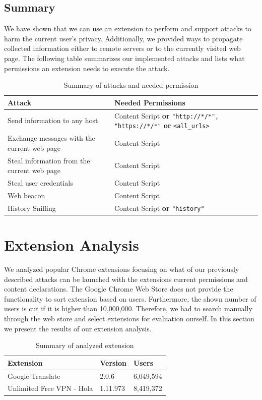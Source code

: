 \documentclass[article,colorback,accentcolor=tud9c,type=bsc]{tudthesis}
\let\stdsection\section
\let\stdsubsection\subsection
\renewcommand\section{\newpage\stdsection}
\renewcommand\subsection{\newpage\stdsubsection}
\begin{document}
\subsection{Summary}
	
	We have shown that we can use an extension to perform and support attacks to harm the current user's privacy. Additionally, we provided ways to propagate collected information either to remote servers or to the currently visited web page. The following table summarizes our implemented attacks and lists what permissions an extension needs to execute the attack.
	
	\begin{table}[h]
		\centering
		\begin{tabular}{|l|l|} \hline
			\textbf{Attack} & \textbf{Needed Permissions} \\ \hline
			Send information to any host & Content Script \textbf{or} \texttt{"http://*/*", "https://*/*"} \textbf{or} \texttt{<all\_urls>} \\
			Exchange messages with the current web page & Content Script \\
			Steal information from the current web page & Content Script \\
			Steal user credentials & Content Script \\
			Web beacon & Content Script \\
			History Sniffing & Content Script \textbf{or} \texttt{"history"} \\ \hline
		\end{tabular}
		\caption{Summary of attacks and needed permission}
		\label{Summary of attacks and needed permission}
	\end{table}
	
\section{Extension Analysis}
	
	We analyzed popular Chrome extensions focusing on what of our previously described attacks can be launched with the extensions current permissions and content declarations. The Google Chrome Web Store does not provide the functionality to sort extension based on users. Furthermore, the shown number of users is cut if it is higher than 10,000,000. Therefore, we had to search manually through the web store and select extensions for evaluation ourself. In this section we present the results of our extension analysis. 
	
	\begin{table}
		\centering
		\begin{tabular}{|l|l|l|} \hline
			\textbf{Extension} & \textbf{Version} & \textbf{Users} \\ \hline
			Google Translate & 2.0.6 & 6,049,594 \\ 
			Unlimited Free VPN - Hola & 1.11.973 & 8,419,372 \\ \hline
		\end{tabular}
		\caption{Summary of analyzed extension}
	\end{table}
	
\end{document}
